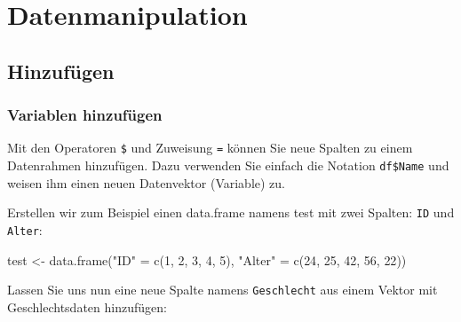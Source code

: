 \documentclass[
]{book}
\newenvironment{Shaded}{\begin{snugshade}}{\end{snugshade}}
\newcommand{\DecValTok}[1]{\textcolor[rgb]{0.00,0.00,0.81}{#1}}
\newcommand{\FunctionTok}[1]{\textcolor[rgb]{0.00,0.00,0.00}{#1}}
\newcommand{\NormalTok}[1]{#1}
\newcommand{\OtherTok}[1]{\textcolor[rgb]{0.56,0.35,0.01}{#1}}
\newcommand{\SpecialCharTok}[1]{\textcolor[rgb]{0.00,0.00,0.00}{#1}}
\newcommand{\StringTok}[1]{\textcolor[rgb]{0.31,0.60,0.02}{#1}}
\begin{document}
\hypertarget{datenmanipulation}{%
\chapter{Datenmanipulation}\label{datenmanipulation}}

\hypertarget{hinzufuxfcgen}{%
\section{Hinzufügen}\label{hinzufuxfcgen}}

\hypertarget{variablen-hinzufuxfcgen}{%
\subsection{Variablen hinzufügen}\label{variablen-hinzufuxfcgen}}

Mit den Operatoren \texttt{\$} und Zuweisung \texttt{=} können Sie neue Spalten zu einem Datenrahmen hinzufügen. Dazu verwenden Sie einfach die Notation \texttt{df\$Name} und weisen ihm einen neuen Datenvektor (Variable) zu.

Erstellen wir zum Beispiel einen data.frame namens test mit zwei Spalten: \texttt{ID} und \texttt{Alter}:

\begin{Shaded}
\begin{Highlighting}[]
\NormalTok{test }\OtherTok{\textless{}{-}} \FunctionTok{data.frame}\NormalTok{(}\StringTok{"ID"} \OtherTok{=} \FunctionTok{c}\NormalTok{(}\DecValTok{1}\NormalTok{, }\DecValTok{2}\NormalTok{, }\DecValTok{3}\NormalTok{, }\DecValTok{4}\NormalTok{, }\DecValTok{5}\NormalTok{),}
                     \StringTok{"Alter"} \OtherTok{=} \FunctionTok{c}\NormalTok{(}\DecValTok{24}\NormalTok{, }\DecValTok{25}\NormalTok{, }\DecValTok{42}\NormalTok{, }\DecValTok{56}\NormalTok{, }\DecValTok{22}\NormalTok{))}
\end{Highlighting}
\end{Shaded}

Lassen Sie uns nun eine neue Spalte namens \texttt{Geschlecht} aus einem Vektor mit Geschlechtsdaten hinzufügen:

\begin{Shaded}
\end{Shaded}
\end{document}
